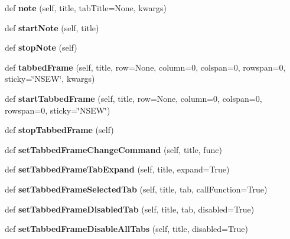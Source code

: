 \begin{DoxyCompactItemize}
def {\bfseries note} (self, title, tab\+Title=None, kwargs)
\item 
\mbox{\label{classappjar_1_1gui_a8b9a840a4ca6a4932bd1649522ced819}} 
def {\bfseries start\+Note} (self, title)
\item 
\mbox{\label{classappjar_1_1gui_a8dbc0f68d6309ad925300ea03a7571a2}} 
def {\bfseries stop\+Note} (self)
\item 
\mbox{\label{classappjar_1_1gui_ade2ab8463b46a5d66a3e0538161370f3}} 
def {\bfseries tabbed\+Frame} (self, title, row=None, column=0, colspan=0, rowspan=0, sticky=\char`\"{}N\+S\+EW\char`\"{}, kwargs)
\item 
\mbox{\label{classappjar_1_1gui_a1715354b7e4b2a9d60beadd325917357}} 
def {\bfseries start\+Tabbed\+Frame} (self, title, row=None, column=0, colspan=0, rowspan=0, sticky=\char`\"{}N\+S\+EW\char`\"{})
\item 
\mbox{\label{classappjar_1_1gui_a00a23d5c6e596158154c1f41448d6df8}} 
def {\bfseries stop\+Tabbed\+Frame} (self)
\item 
\mbox{\label{classappjar_1_1gui_a7e9a2f218297cd213e4d11f645fb4696}} 
def {\bfseries set\+Tabbed\+Frame\+Change\+Command} (self, title, func)
\item 
\mbox{\label{classappjar_1_1gui_ac82bc998fe986d280b9f4be991b1aaee}} 
def {\bfseries set\+Tabbed\+Frame\+Tab\+Expand} (self, title, expand=True)
\item 
\mbox{\label{classappjar_1_1gui_aa1dfd83c4d5a859d1adf434ec31d73f4}} 
def {\bfseries set\+Tabbed\+Frame\+Selected\+Tab} (self, title, tab, call\+Function=True)
\item 
\mbox{\label{classappjar_1_1gui_aa4109b634a977af235426a909bfedeb8}} 
def {\bfseries set\+Tabbed\+Frame\+Disabled\+Tab} (self, title, tab, disabled=True)
\item 
\mbox{\label{classappjar_1_1gui_a55419a165e16eb28afb2b20b31c5eb0d}} 
def {\bfseries set\+Tabbed\+Frame\+Disable\+All\+Tabs} (self, title, disabled=True)

\end{DoxyCompactItemize}
